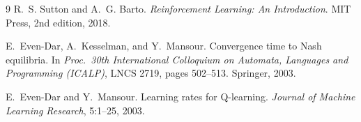 \documentclass{article}
\begin{document}
{\begin{thebibliography}{9}
R.~S. Sutton and A.~G. Barto.
\newblock \emph{Reinforcement Learning: An Introduction}.
\newblock MIT Press, 2nd edition, 2018.

E.~Even-Dar, A.~Kesselman, and Y.~Mansour.
\newblock Convergence time to {N}ash equilibria.
\newblock In \emph{Proc.\ 30th International Colloquium on Automata, Languages and
  Programming (ICALP)}, LNCS 2719, pages 502--513. Springer, 2003.

E.~Even-Dar and Y.~Mansour.
\newblock Learning rates for {Q}-learning.
\newblock \emph{Journal of Machine Learning Research}, 5:1--25, 2003.
\end{thebibliography}}
\end{document}
